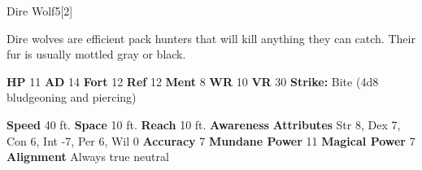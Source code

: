   
  \begin{monsection}{Dire Wolf}{5}[2]
    \vspace{-1em}\vspace{-1em}
    \vspace{0em}

    
      Dire wolves are efficient pack hunters that will kill anything they can catch.
      Their fur is usually mottled gray or black.
    
    

    \begin{spellcontent}
      \begin{spelltargetinginfo}
        \pari \textbf{HP} 11 \monsep
          \textbf{AD} 14 \monsep
          \textbf{Fort} 12 \monsep
          \textbf{Ref} 12 \monsep
          \textbf{Ment} 8
        \pari \textbf{WR} 10 \monsep
        \textbf{VR} 30
        \pari \textbf{Strike:}
            Bite  (4d8 bludgeoning and piercing)
      \end{spelltargetinginfo}
    \end{spellcontent}
    \begin{monsterfooter}
      \pari \textbf{Speed} 40 ft. \monsep
        \textbf{Space} 10 ft. \monsep
        \textbf{Reach} 10 ft.
      \pari \textbf{Awareness} 
      \pari \textbf{Attributes}
        Str 8, Dex 7,
        Con 6, Int -7,
        Per 6, Wil 0
      \pari \textbf{Accuracy} 7 \monsep
        \textbf{Mundane Power} 11 \monsep
      \textbf{Magical Power} 7
      \pari \textbf{Alignment} Always true neutral
    \end{monsterfooter}
  \end{monsection}
  
